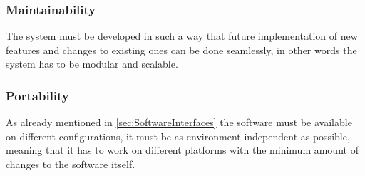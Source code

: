 \subsubsection{Maintainability}
The system must be developed in such a way that future implementation of new features and changes to existing ones can be done seamlessly, in other words the system has to be modular and scalable.
\subsubsection{Portability}
As already mentioned in \autoref{sec:SoftwareInterfaces} the software must be available on different configurations, it must be as environment independent as possible, meaning that it has to work on different platforms with the minimum amount of changes to the software itself.


